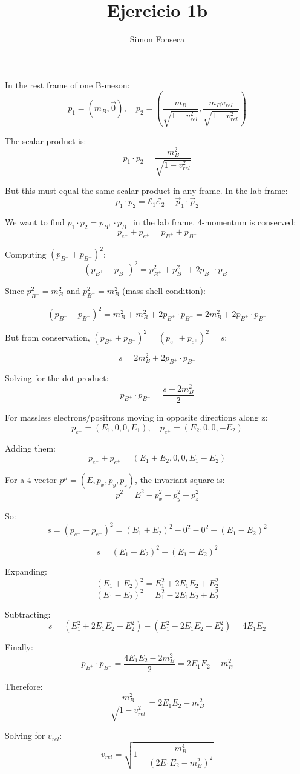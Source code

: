 \documentclass[]{article}
\title{Ejercicio 1b}
\author{Simon Fonseca}
\numberwithin{equation}{section}
\newcommand{\0}{\textcolor{gray}{0}}
\begin{document}
\maketitle
In the rest frame of one B-meson:
$$p_1 = (m_B, \vec{0}), \quad p_2 = \left(\frac{m_B}{\sqrt{1-v_{rel}^2}}, \frac{m_B v_{rel}}{\sqrt{1-v_{rel}^2}}\right)$$

The scalar product is:
$$p_1 \cdot p_2 = \frac{m_B^2}{\sqrt{1-v_{rel}^2}}$$

But this must equal the same scalar product in any frame. In the lab frame:
$$p_1 \cdot p_2 = \mathcal{E}_1 \mathcal{E}_2 - \vec{p}_1 \cdot \vec{p}_2$$

We want to find $p_1 \cdot p_2 = p_{B^+} \cdot p_{B^-}$ in the lab frame. 4-momentum is conserved:
$$p_{e^-} + p_{e^+} = p_{B^+} + p_{B^-}$$

Computing $(p_{B^+} + p_{B^-})^2$:
$$(p_{B^+} + p_{B^-})^2 = p_{B^+}^2 + p_{B^-}^2 + 2p_{B^+} \cdot p_{B^-}$$

Since $p_{B^+}^2 = m_B^2$ and $p_{B^-}^2 = m_B^2$ (mass-shell condition):

$$(p_{B^+} + p_{B^-})^2 = m_B^2 + m_B^2 + 2p_{B^+} \cdot p_{B^-} = 2m_B^2 + 2p_{B^+} \cdot p_{B^-}$$

But from conservation, $(p_{B^+} + p_{B^-})^2 = (p_{e^-} + p_{e^+})^2 = s$:

$$s = 2m_B^2 + 2p_{B^+} \cdot p_{B^-}$$

Solving for the dot product:
$$p_{B^+} \cdot p_{B^-} = \frac{s - 2m_B^2}{2}$$

For massless electrons/positrons moving in opposite directions along z:
$$p_{e^-} = (E_1, 0, 0, E_1), \quad p_{e^+} = (E_2, 0, 0, -E_2)$$

Adding them:
$$p_{e^-} + p_{e^+} = (E_1 + E_2, 0, 0, E_1 - E_2)$$

For a 4-vector $p^\mu = (E, p_x, p_y, p_z)$, the invariant square is:
$$p^2 = E^2 - p_x^2 - p_y^2 - p_z^2$$

So:
$$s = (p_{e^-} + p_{e^+})^2 = (E_1 + E_2)^2 - 0^2 - 0^2 - (E_1 - E_2)^2$$

$$s = (E_1 + E_2)^2 - (E_1 - E_2)^2$$

Expanding:
$$(E_1 + E_2)^2 = E_1^2 + 2E_1E_2 + E_2^2$$
$$(E_1 - E_2)^2 = E_1^2 - 2E_1E_2 + E_2^2$$

Subtracting:
$$s = (E_1^2 + 2E_1E_2 + E_2^2) - (E_1^2 - 2E_1E_2 + E_2^2) = 4E_1E_2$$

Finally:
$$p_{B^+} \cdot p_{B^-} = \frac{4E_1E_2 - 2m_B^2}{2} = 2E_1E_2 - m_B^2$$


Therefore:
$$\frac{m_B^2}{\sqrt{1-v_{rel}^2}} = 2E_1E_2 - m_B^2$$

Solving for $v_{rel}$:
$$v_{rel} = \sqrt{1 - \frac{m_B^4}{(2E_1E_2 - m_B^2)^2}}$$
\end{document}
